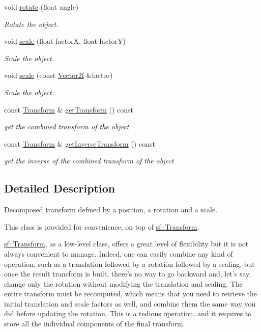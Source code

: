 \begin{DoxyCompactItemize}
void \hyperlink{classsf_1_1_transformable_af8a5ffddc0d93f238fee3bf8efe1ebda}{rotate} (float angle)
\begin{DoxyCompactList}\small\item\em Rotate the object. \end{DoxyCompactList}\item 
void \hyperlink{classsf_1_1_transformable_a3de0c6d8957f3cf318092f3f60656391}{scale} (float factor\+X, float factor\+Y)
\begin{DoxyCompactList}\small\item\em Scale the object. \end{DoxyCompactList}\item 
void \hyperlink{classsf_1_1_transformable_adecaa6c69b1f27dd5194b067d96bb694}{scale} (const \hyperlink{classsf_1_1_vector2}{Vector2f} \&factor)
\begin{DoxyCompactList}\small\item\em Scale the object. \end{DoxyCompactList}\item 
const \hyperlink{classsf_1_1_transform}{Transform} \& \hyperlink{classsf_1_1_transformable_a3b48c3362e3e2c14fef7551252deb7bb}{get\+Transform} () const 
\begin{DoxyCompactList}\small\item\em get the combined transform of the object \end{DoxyCompactList}\item 
const \hyperlink{classsf_1_1_transform}{Transform} \& \hyperlink{classsf_1_1_transformable_ab00de62b5d1efb2ee4cf2566dea98175}{get\+Inverse\+Transform} () const 
\begin{DoxyCompactList}\small\item\em get the inverse of the combined transform of the object \end{DoxyCompactList}\end{DoxyCompactItemize}


\subsection{Detailed Description}
Decomposed transform defined by a position, a rotation and a scale. 

This class is provided for convenience, on top of \hyperlink{classsf_1_1_transform}{sf\+::\+Transform}.

\hyperlink{classsf_1_1_transform}{sf\+::\+Transform}, as a low-\/level class, offers a great level of flexibility but it is not always convenient to manage. Indeed, one can easily combine any kind of operation, such as a translation followed by a rotation followed by a scaling, but once the result transform is built, there's no way to go backward and, let's say, change only the rotation without modifying the translation and scaling. The entire transform must be recomputed, which means that you need to retrieve the initial translation and scale factors as well, and combine them the same way you did before updating the rotation. This is a tedious operation, and it requires to store all the individual components of the final transform.

